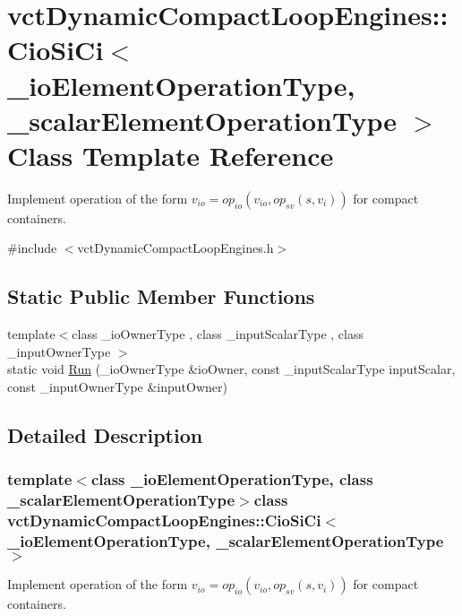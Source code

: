 \hypertarget{classvct_dynamic_compact_loop_engines_1_1_cio_si_ci}{}\section{vct\+Dynamic\+Compact\+Loop\+Engines\+:\+:Cio\+Si\+Ci$<$ \+\_\+io\+Element\+Operation\+Type, \+\_\+scalar\+Element\+Operation\+Type $>$ Class Template Reference}
\label{classvct_dynamic_compact_loop_engines_1_1_cio_si_ci}


Implement operation of the form $v_{io} = op_{io}(v_{io}, op_{sv}(s, v_i))$ for compact containers.  




{\ttfamily \#include $<$vct\+Dynamic\+Compact\+Loop\+Engines.\+h$>$}

\subsection*{Static Public Member Functions}
\begin{DoxyCompactItemize}
\item 
{\footnotesize template$<$class \+\_\+io\+Owner\+Type , class \+\_\+input\+Scalar\+Type , class \+\_\+input\+Owner\+Type $>$ }\\static void \hyperlink{classvct_dynamic_compact_loop_engines_1_1_cio_si_ci_a79209528dbb519c9b8454286bb76f774}{Run} (\+\_\+io\+Owner\+Type \&io\+Owner, const \+\_\+input\+Scalar\+Type input\+Scalar, const \+\_\+input\+Owner\+Type \&input\+Owner)
\end{DoxyCompactItemize}


\subsection{Detailed Description}
\subsubsection*{template$<$class \+\_\+io\+Element\+Operation\+Type, class \+\_\+scalar\+Element\+Operation\+Type$>$class vct\+Dynamic\+Compact\+Loop\+Engines\+::\+Cio\+Si\+Ci$<$ \+\_\+io\+Element\+Operation\+Type, \+\_\+scalar\+Element\+Operation\+Type $>$}

Implement operation of the form $v_{io} = op_{io}(v_{io}, op_{sv}(s, v_i))$ for compact containers. 

